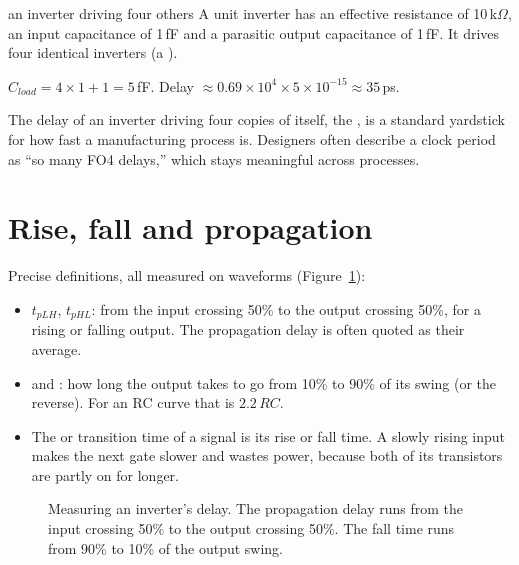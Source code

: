 \begin{worked}{an inverter driving four others}
A unit inverter has an effective resistance of 10\,k$\Omega$, an input capacitance of 1\,fF and a parasitic output capacitance of 1\,fF. It drives four identical inverters (a ).

$C_{load} = 4 \times 1 + 1 = 5$\,fF. Delay $\approx 0.69 \times 10^4 \times 5\times10^{-15} \approx 35$\,ps.
\end{worked}

The delay of an inverter driving four copies of itself, the , is a standard yardstick for how fast a manufacturing process is. Designers often describe a clock period as ``so many FO4 delays,'' which stays meaningful across processes.

\section{Rise, fall and propagation}

Precise definitions, all measured on waveforms (Figure~\ref{fig:riseprop}):
\begin{itemize}
  \item $t_{pLH}$, $t_{pHL}$: from the input crossing 50\% to the output crossing 50\%, for a rising or falling output. The propagation delay is often quoted as their average.
  \item {} and : how long the output takes to go from 10\% to 90\% of its swing (or the reverse). For an RC curve that is $2.2\,RC$.
  \item The  or transition time of a signal is its rise or fall time. A slowly rising input makes the next gate slower and wastes power, because both of its transistors are partly on for longer.
\end{itemize}

\begin{figure}[h]
\centering
{}
\caption{Measuring an inverter's delay. The propagation delay runs from the input crossing 50\% to the output crossing 50\%. The fall time runs from 90\% to 10\% of the output swing.}
\label{fig:riseprop}
\end{figure}

